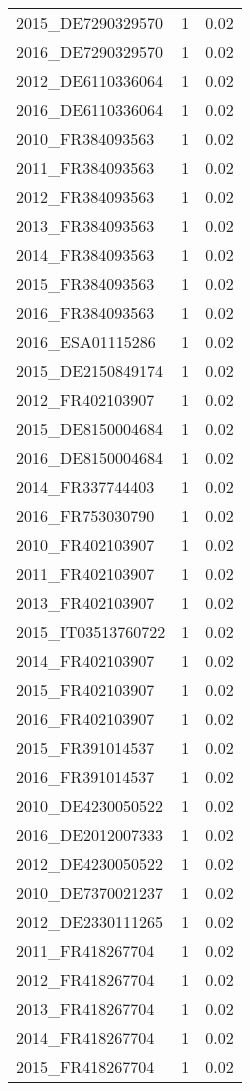 \begin{table*}[htbp]
\begin{tabular}{lrr}
2015_DE7290329570 & 1 & 0.02 \\
2016_DE7290329570 & 1 & 0.02 \\
2012_DE6110336064 & 1 & 0.02 \\
2016_DE6110336064 & 1 & 0.02 \\
2010_FR384093563 & 1 & 0.02 \\
2011_FR384093563 & 1 & 0.02 \\
2012_FR384093563 & 1 & 0.02 \\
2013_FR384093563 & 1 & 0.02 \\
2014_FR384093563 & 1 & 0.02 \\
2015_FR384093563 & 1 & 0.02 \\
2016_FR384093563 & 1 & 0.02 \\
2016_ESA01115286 & 1 & 0.02 \\
2015_DE2150849174 & 1 & 0.02 \\
2012_FR402103907 & 1 & 0.02 \\
2015_DE8150004684 & 1 & 0.02 \\
2016_DE8150004684 & 1 & 0.02 \\
2014_FR337744403 & 1 & 0.02 \\
2016_FR753030790 & 1 & 0.02 \\
2010_FR402103907 & 1 & 0.02 \\
2011_FR402103907 & 1 & 0.02 \\
2013_FR402103907 & 1 & 0.02 \\
2015_IT03513760722 & 1 & 0.02 \\
2014_FR402103907 & 1 & 0.02 \\
2015_FR402103907 & 1 & 0.02 \\
2016_FR402103907 & 1 & 0.02 \\
2015_FR391014537 & 1 & 0.02 \\
2016_FR391014537 & 1 & 0.02 \\
2010_DE4230050522 & 1 & 0.02 \\
2016_DE2012007333 & 1 & 0.02 \\
2012_DE4230050522 & 1 & 0.02 \\
2010_DE7370021237 & 1 & 0.02 \\
2012_DE2330111265 & 1 & 0.02 \\
2011_FR418267704 & 1 & 0.02 \\
2012_FR418267704 & 1 & 0.02 \\
2013_FR418267704 & 1 & 0.02 \\
2014_FR418267704 & 1 & 0.02 \\
2015_FR418267704 & 1 & 0.02 \\

\end{tabular}
\end{table*}
